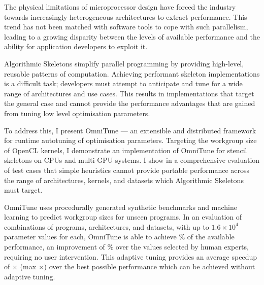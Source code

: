 The physical limitations of microprocessor design have forced the
industry towards increasingly heterogeneous architectures to extract
performance. This trend has not been matched with software tools to
cope with such parallelism, leading to a growing disparity between the
levels of available performance and the ability for application
developers to exploit it.

Algorithmic Skeletons simplify parallel programming by providing
high-level, reusable patterns of computation. Achieving performant
skeleton implementations is a difficult task; developers must attempt
to anticipate and tune for a wide range of architectures and use
cases. This results in implementations that target the general case
and cannot provide the performance advantages that are gained from
tuning low level optimisation parameters.

To address this, I present OmniTune --- an extensible and distributed
framework for runtime autotuning of optimisation parameters. Targeting
the workgroup size of OpenCL kernels, I demonstrate an implementation
of OmniTune for stencil skeletons on CPUs and multi-GPU systems. I
show in a comprehensive evaluation of 
test cases that simple heuristics cannot provide portable performance
across the range of architectures, kernels, and datasets which
Algorithmic Skeletons must target.


OmniTune uses procedurally generated synthetic benchmarks and machine
learning to predict workgroup sizes for unseen programs. In an
evaluation of  combinations of programs,
architectures, and datasets, with up to $1.6\times10^4$ parameter
values for each, OmniTune is able to achieve
$\%$ of the available
performance, an improvement of
$\%$ over the
values selected by human experts, requiring no user intervention. This
adaptive tuning provides an average speedup of
$\times$ (max
$\times$) over the best
possible performance which can be achieved without adaptive tuning.

